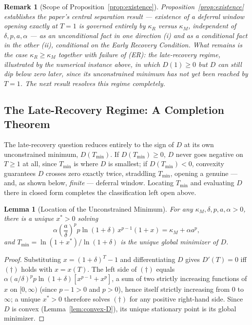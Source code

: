 \documentclass[11pt]{article}
\newtheorem{lemma}[definition]{Lemma}
\newtheorem*{remark}{Remark}
\begin{document}
\begin{remark}[Scope of Proposition~\ref{prop:existence}]
Proposition~\ref{prop:existence} establishes the paper's central separation result — existence of a deferral window opening exactly at $T=1$ is governed entirely by $\kappa_R$ versus $\kappa_M$, independent of $\delta,p,a,\alpha$ — as an unconditional fact in one direction (i) and as a conditional fact in the other (ii), conditional on the Early Recovery Condition. What remains is the case $\kappa_R\geq\kappa_M$ together with \emph{failure} of (ER): the late-recovery regime, illustrated by the numerical instance above, in which $D(1)\geq0$ but $D$ can still dip below zero later, since its unconstrained minimum has not yet been reached by $T=1$. The next result resolves this regime completely.
\end{remark}

\subsection{The Late-Recovery Regime: A Completion Theorem}

The late-recovery question reduces entirely to the sign of $D$ at its own unconstrained minimum, $D(T_{\min})$. If $D(T_{\min})\geq 0$, $D$ never goes negative on $T\geq1$ at all, since $T_{\min}$ is where $D$ is smallest; if $D(T_{\min})<0$, convexity guarantees $D$ crosses zero exactly twice, straddling $T_{\min}$, opening a genuine — and, as shown below, \emph{finite} — deferral window. Locating $T_{\min}$ and evaluating $D$ there in closed form completes the classification left open above.

\begin{lemma}[Location of the Unconstrained Minimum]
\label{lem:xstar}
For any $\kappa_M,\delta,p,a,\alpha>0$, there is a unique $x^*>0$ solving
\[
\alpha\left(\frac{a}{\delta}\right)^p p\ln(1+\delta)\,x^{p-1}(1+x) = \kappa_M + \alpha a^p, \tag{$\dagger$}
\]
and $T_{\min} = \ln(1+x^*)/\ln(1+\delta)$ is the unique global minimizer of $D$.
\end{lemma}

\begin{proof}
Substituting $x = (1+\delta)^T - 1$ and differentiating $D$ gives $D'(T)=0$ iff $(\dagger)$ holds with $x=x(T)$. The left side of $(\dagger)$ equals $\alpha(a/\delta)^p p\ln(1+\delta)[x^{p-1}+x^p]$, a sum of two strictly increasing functions of $x$ on $[0,\infty)$ (since $p-1>0$ and $p>0$), hence itself strictly increasing from $0$ to $\infty$; a unique $x^*>0$ therefore solves $(\dagger)$ for any positive right-hand side. Since $D$ is convex (Lemma~\ref{lem:convex-D}), its unique stationary point is its global minimizer.
\end{proof}
\end{document}
